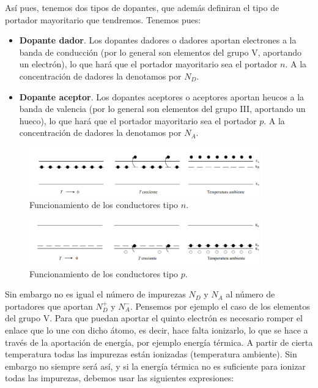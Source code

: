 Así pues, tenemos dos tipos de dopantes, que además definiran el tipo de portador mayoritario que tendremos. Tenemos pues:

\begin{itemize}
	\item \textbf{Dopante dador}. Los dopantes dadores o dadores aportan electrones a la banda de conducción (por lo general son elementos del grupo V, aportando un electrón), lo que hará que el portador mayoritario sea el portador $n$. A la concentración de dadores la denotamos por $N_D$.
	\item \textbf{Dopante aceptor}. Los dopantes aceptores o aceptores aportan heucos a la banda de valencia (por lo general son elementos del grupo III, aportando un hueco), lo que hará que el portador mayoritario sea el portador $p$. A la concentración de dadores la denotamos por $N_A$.
\end{itemize}

\begin{figure}[h!] \centering
	\includegraphics[width=0.9\textwidth]{Cuerpo/Ch_01/01_04.png}
	\caption{Funcionamiento de los conductores tipo $n$.}
\end{figure}

\begin{figure}[h!] \centering
	\includegraphics[width=0.9\textwidth]{Cuerpo/Ch_01/01_05.png}
	\caption{Funcionamiento de los conductores tipo $p$.}
\end{figure}

Sin embargo no es igual el número de impurezas $N_D$ y $N_A$ al número de portadores que aportan $N_D^+$ y $N_A^-$. Pensemos por ejemplo el caso de los elementos del grupo V. Para que puedan aportar el quinto electrón es necesario romper el enlace que lo une con dicho átomo, es decir, hace falta ionizarlo, lo que se hace a través de la aportación de energía, por ejemplo energía térmica. A partir de cierta temperatura todas las impurezas están ionizadas (temperatura ambiente). Sin embargo no siempre será así, y si la energía térmica no es suficiente para ionizar todas las impurezas, debemos usar las siguientes expresiones:

